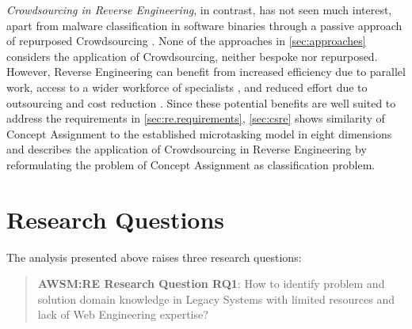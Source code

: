 \emph{\gls{Crowdsourcing} in \gls{Reverse Engineering}}, in contrast, has not seen much interest, apart from malware classification in software binaries through a passive approach of repurposed \gls{Crowdsourcing} \autocite{Saxe2014}.
None of the approaches in \cref{sec:approaches} considers the application of \gls{Crowdsourcing}, neither bespoke nor repurposed.
However, \gls{Reverse Engineering} can benefit from increased efficiency due to parallel work, access to a wider workforce of specialists \autocite{Latoza2016}, and reduced effort due to outsourcing and cost reduction \autocite{Stol2014}.
Since these potential benefits are well suited to address the requirements in \cref{sec:re.requirements}, \cref{sec:csre} shows similarity of \gls{Concept Assignment} to the established microtasking model in eight dimensions and describes the application of \gls{Crowdsourcing} in \gls{Reverse Engineering} by reformulating the problem of \gls{Concept Assignment} as classification problem.

\vspace{-20pt}
\hypertarget{sec:re.research-questions}{%
\section{Research Questions}\label{sec:re.research-questions}}
\vspace{5pt}

The analysis presented above raises three research questions:

\begin{quote}
\textbf{AWSM:RE Research Question RQ1}: How to identify problem and solution domain knowledge in \glspl{Legacy System} with limited resources and lack of \gls{Web Engineering} expertise?
\end{quote}

